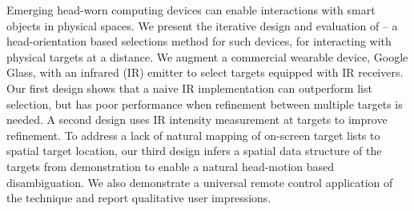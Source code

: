 
Emerging head-worn computing devices can enable interactions with smart objects in physical spaces. 
%
We present the iterative design and evaluation of \systemname -- a head-orientation based selections method for such devices, for interacting with physical targets at a distance. We augment a commercial wearable device, Google Glass, with an infrared (IR) emitter to select targets equipped with IR receivers. Our first design shows that a naive IR implementation can outperform list selection, but has poor performance when refinement between multiple targets is needed. A second design uses IR intensity measurement at targets to improve refinement. To address a lack of natural mapping of on-screen target lists to spatial target location, our third design infers a spatial data structure of the targets from demonstration to enable a natural head-motion based disambiguation.
%
We also demonstrate a universal remote control application of the technique and report qualitative user impressions.